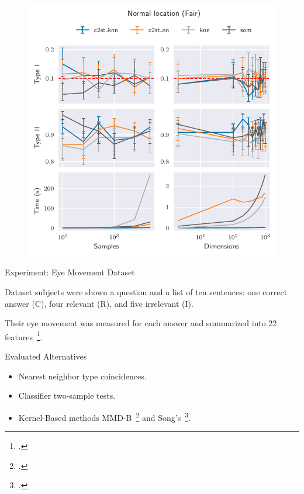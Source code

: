 \documentclass[10pt,compress]{beamer}
\begin{document}
\begin{frame}{}
\begin{figure}
    \centering
    \includegraphics[height=\textheight]{normal_location_fair}
\end{figure}
\end{frame}

\begin{frame}{Experiment: Eye Movement Dataset}
    \begin{block}{Dataset}
         subjects were shown a question and a list of ten 
        sentences: one correct answer (C), four relevant (R), and five irrelevant (I).
        
        Their eye movement was measured for each answer and summarized into 22 features~\footcite{salojarvi2005inferring}.
    \end{block}
    \begin{block}{Evaluated Alternatives}
        \smallskip
        \begin{itemize}
            \item Nearest neighbor type coincidences.
            \item Classifier two-sample tests.
            \item Kernel-Based methods MMD-B~\footcite{zaremba2013b} and Song's~\footcite{song2021fast}.
        \end{itemize}
    \end{block}
\end{frame}
\end{document}
